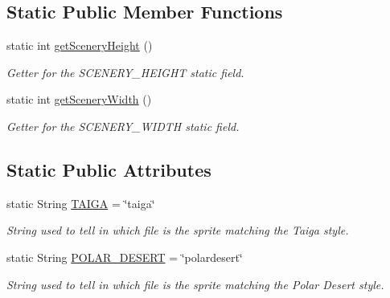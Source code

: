\subsection*{Static Public Member Functions}
\begin{DoxyCompactItemize}
\item 
static int \hyperlink{classworld_1_1scenery_1_1_scenery_ad49a4c8ba7e7c464b49b30efea953a66}{get\-Scenery\-Height} ()
\begin{DoxyCompactList}\small\item\em Getter for the S\-C\-E\-N\-E\-R\-Y\-\_\-\-H\-E\-I\-G\-H\-T static field. \end{DoxyCompactList}\item 
static int \hyperlink{classworld_1_1scenery_1_1_scenery_ab0ba1fc1e7266f25ac7b1b7d36d2b5b8}{get\-Scenery\-Width} ()
\begin{DoxyCompactList}\small\item\em Getter for the S\-C\-E\-N\-E\-R\-Y\-\_\-\-W\-I\-D\-T\-H static field. \end{DoxyCompactList}\end{DoxyCompactItemize}
\subsection*{Static Public Attributes}
\begin{DoxyCompactItemize}
\item 
static String \hyperlink{interfaceworld_1_1scenery_1_1_taiga_theme_ad3418d8f4936efb0ef1e3eb2009a34f0}{T\-A\-I\-G\-A} = \char`\"{}taiga\char`\"{}
\begin{DoxyCompactList}\small\item\em String used to tell in which file is the sprite matching the Taiga style. \end{DoxyCompactList}\item 
static String \hyperlink{interfaceworld_1_1scenery_1_1_polar_desert_theme_a48dd1801e0146ea2306dadcbdee81b77}{P\-O\-L\-A\-R\-\_\-\-D\-E\-S\-E\-R\-T} = \char`\"{}polardesert\char`\"{}
\begin{DoxyCompactList}\small\item\em String used to tell in which file is the sprite matching the Polar Desert style. \end{DoxyCompactList}\end{DoxyCompactItemize}
